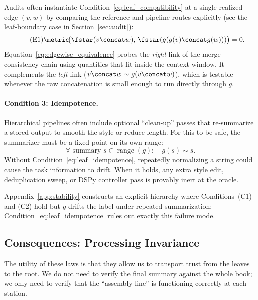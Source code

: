 \begin{remark}\label{rem:edgewise_compatibility}
Audits often instantiate Condition~\eqref{eq:leaf_compatibility} at a single realized edge $(v,w)$ by comparing the reference and pipeline routes explicitly (see the leaf-boundary case in Section~\ref{sec:audit}):
\begin{equation}\tag{E1}\label{eq:edgewise_equivalence}
\metric\!\big(\fstar(v\concat w),\,\fstar(g(g(v)\concat g(w)))\big)=0.
\end{equation}
Equation~\eqref{eq:edgewise_equivalence} probes the \emph{right} link of the merge-consistency chain using quantities that fit inside the context window. It complements the \emph{left} link ($v\concat w \sim g(v\concat w)$), which is testable whenever the raw concatenation is small enough to run directly through $g$.
\end{remark}

\paragraph{Condition 3: Idempotence.}
Hierarchical pipelines often include optional ``clean-up'' passes that re-summarize a stored output to smooth the style or reduce length. For this to be safe, the summarizer must be a fixed point on its own range:
\begin{equation}\tag{C3}\label{eq:leaf_idempotence}
\forall \text{ summary } s\in\operatorname{range}(g):\quad g(s)\sim s.
\end{equation}
Without Condition~\eqref{eq:leaf_idempotence}, repeatedly normalizing a string could cause the task information to drift. When it holds, any extra style edit, deduplication sweep, or DSPy controller pass is provably inert at the oracle.

Appendix~\ref{app:stability} constructs an explicit hierarchy where Conditions~(C1) and (C2) hold but $g$ drifts the label under repeated summarization; Condition~\eqref{eq:leaf_idempotence} rules out exactly this failure mode.

\subsection{Consequences: Processing Invariance}

The utility of these laws is that they allow us to transport trust from the leaves to the root. We do not need to verify the final summary against the whole book; we only need to verify that the ``assembly line'' is functioning correctly at each station.

